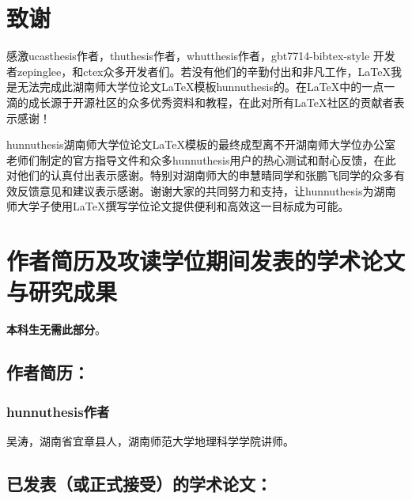 \chapter[致谢]{致\quad 谢}%
\pagestyle{noheaderstyle}%

感激ucasthesis作者，thuthesis作者，whutthesis作者，gbt7714-bibtex-style
开发者zepinglee，和ctex众多开发者们。若没有他们的辛勤付出和非凡工作，\LaTeX{}我是无法完成此湖南师大学位论文\LaTeX{}模板hunnuthesis的。在\LaTeX{}中的一点一滴的成长源于开源社区的众多优秀资料和教程，在此对所有\LaTeX{}社区的贡献者表示感谢！

hunnuthesis湖南师大学位论文\LaTeX{}模板的最终成型离不开湖南师大学位办公室老师们制定的官方指导文件和众多hunnuthesis用户的热心测试和耐心反馈，在此对他们的认真付出表示感谢。特别对湖南师大的申慧晴同学和张鹏飞同学的众多有效反馈意见和建议表示感谢。谢谢大家的共同努力和支持，让hunnuthesis为湖南师大学子使用\LaTeX{}撰写学位论文提供便利和高效这一目标成为可能。


\chapter{作者简历及攻读学位期间发表的学术论文与研究成果}

\textbf{本科生无需此部分}。

\section*{作者简历：}


\subsection*{hunnuthesis作者}

吴涛，湖南省宜章县人，湖南师范大学地理科学学院讲师。

\section*{已发表（或正式接受）的学术论文：}

